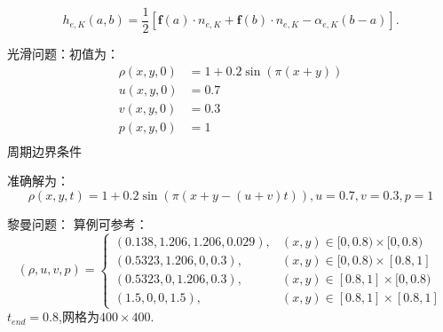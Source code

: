 \documentclass{book}
\begin{document}
\begin{equation}
    h_{e, K}(a, b)=\frac{1}{2}\left[\mathbf{f}(a) \cdot n_{e, K}+\mathbf{f}(b) \cdot n_{e, K}-\alpha_{e, K}(b-a)\right] .
\end{equation}

\begin{example}{}{}
    光滑问题：初值为：
    \begin{equation}
        \begin{aligned}
            \rho(x,y,0) & = 1+0.2\sin(\pi(x+y)) \\
            u(x,y,0)    & = 0.7                 \\
            v(x,y,0)    & = 0.3                 \\
            p(x,y,0)    & = 1                   \\
        \end{aligned}
    \end{equation}
    周期边界条件

    准确解为：
    \begin{equation}
        \rho(x,y,t) = 1+0.2\sin(\pi(x+y-(u+v)t)),u=0.7,v=0.3,p=1
    \end{equation}
\end{example}



\begin{example}{}{}黎曼问题：
    算例可参考：\cite{RN114}
    \begin{equation}
        (\rho, u, v, p)=\begin{cases}
            (0.138,1.206,1.206,0.029), & (x, y) \in[0,0.8) \times[0,0.8) \\
            (0.5323,1.206,0,0.3),      & (x, y) \in[0,0.8) \times[0.8,1] \\
            (0.5323,0,1.206,0.3),      & (x, y) \in[0.8,1] \times[0,0.8) \\
            (1.5,0,0,1.5),             & (x, y) \in[0.8,1] \times[0.8,1]
        \end{cases}
    \end{equation}
    $t_{end}=0.8$,网格为$400\times400$.

\end{example}
\end{document}
